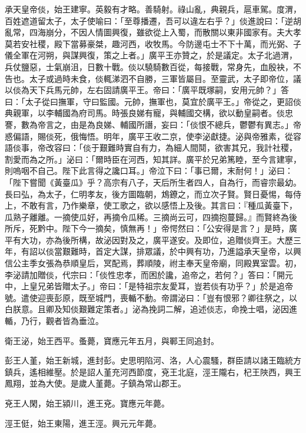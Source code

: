 \begin{pinyinscope}
 承天皇帝倓，始王建寧。英毅有才略。善騎射。祿山亂，典親兵，扈車駕。度渭，百姓遮道留太子，太子使喻曰：「至尊播遷，吾可以違左右乎？」倓進說曰：「逆胡亂常，四海崩分，不因人情圖興復，雖欲從上入蜀，而散關以東非國家有。夫大孝莫若安社稷，殿下當募豪桀，趣河西，收牧馬。今防邊屯士不下十萬，而光弼、子儀全軍在河朔，與謀興復，策之上者。」廣平王亦贊之，於是議定。太子北過渭，兵仗鹽惡，士氣崩沮，日數十戰。倓以驍騎數百從，每接戰，常身先，血殷袂，不告也。太子或過時未食，倓輒涕泗不自勝，三軍皆屬目。至靈武，太子即帝位，議以倓為天下兵馬元帥，左右固請廣平王。帝曰：「廣平既塚嗣，安用元帥？」答曰：「太子從曰撫軍，守曰監國。元帥，撫軍也，莫宜於廣平王。」帝從之，更詔倓典親軍，以李輔國為府司馬。時張良娣有寵，與輔國交構，欲以動皇嗣者。倓忠謇，數為帝言之，由是為良娣、輔國所譖，妄曰：「倓恨不總兵，鬱鬱有異志。」帝惑偏語，賜倓死，俄悔悟。明年，廣平王收二京，使李泌獻捷。泌與帝雅素，從容語倓事，帝改容曰：「倓于艱難時實自有力，為細人間鬩，欲害其兄，我計社稷，割愛而為之所。」泌曰：「爾時臣在河西，知其詳。廣平於兄弟篤睦，至今言建寧，則嗚咽不自己。陛下此言得之讒口耳。」帝泣下曰：「事已爾，末耐何！」泌曰：「陛下嘗聞《黃臺瓜》乎？高宗有八子，天后所生者四人，自為行，而睿宗最幼。長曰弘，為太子，仁明孝友，後方圖臨朝，鴆鐐之，而立次子賢。賢日憂惕，每侍上，不敢有言，乃作樂章，使工歌之，欲以感悟上及後。其言曰：『種瓜黃臺下，瓜熟子離離。一摘使瓜好，再摘令瓜稀。三摘尚云可，四摘抱蔓歸。』而賢終為後所斥，死黔中。陛下今一摘矣，慎無再！」帝愕然曰：「公安得是言？」是時，廣平有大功，亦為後所構，故泌因對及之，廣平遂安。及即位，追贈倓齊王。大歷三年，有詔以倓當艱難時，首定大謀，排眾議，於中興有功，乃進謚承天皇帝，以興信公主季女張為恭順皇后，冥配焉，葬順陵，祔主奉天皇帝廟，同殿異室雲。初，李泌請加贈倓，代宗曰：「倓性忠孝，而困於讒，追帝之，若何？」答曰：「開元中，上皇兄弟皆贈太子。」帝曰：「是特祖宗友愛耳，豈若倓有功乎？」於是追帝號。遣使迎喪彭原，既至城門，喪輴不動。帝謂泌曰：「豈有恨邪？卿往祭之，以白朕意。且卿及知倓艱難定策者。」泌為挽詞二解，追述倓志，命挽士唱，泌因進輴，乃行，觀者皆為垂泣。



 衛王泌，始王西平。蚤薨，寶應元年五月，與鄆王同追封。



 彭王人堇，始王新城，進封彭。史思明陷河、洛，人心震騷，群臣請以諸王臨統方鎮兵，遙相維壓。於是詔人堇充河西節度，兗王北庭，涇王隴右，杞王陜西，興王鳳翔，並為大使。是歲人堇薨。子鎮為常山郡王。



 兗王人閑，始王潁川，進王兗。寶應元年薨。



 涇王侹，始王東陽，進王涇。興元元年薨。




\end{pinyinscope}
